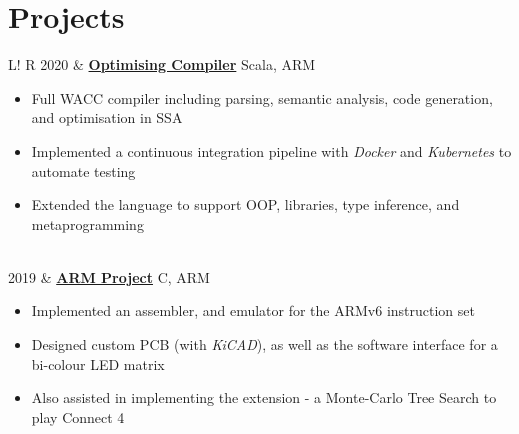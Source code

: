\documentclass[10pt, a4paper]{article}
\newcommand\vsep{\color{lightgray} \vrule width 0.5pt}
\newcommand\sect[1]{\section*{\Large\sc #1}}
\newcommand\itemizespace{\vspace{-0.65\baselineskip}}
\newcommand\tspace{\hfill}
\begin{document}
        \sect{Projects}
            \begin{tabular}{L!{\vsep}R}
                2020 & \href{https://github.com/lin-e/WACC}{\textbf{Optimising Compiler}} \tspace Scala, ARM
                    \begin{itemize}[label=\raisebox{0.25ex}{\tiny$\bullet$}]
                        \setlength{\itemindent}{-0.125in}
                        \item Full WACC compiler including parsing, semantic analysis, code generation, and optimisation in SSA
                        \item Implemented a continuous integration pipeline with \textit{Docker} and \textit{Kubernetes} to automate testing
                        \item Extended the language to support OOP, libraries, type inference, and metaprogramming
                        \itemizespace
                    \end{itemize} \\
                2019 & \href{https://github.com/lin-e/imperial-arm11}{\textbf{ARM Project}} \tspace C, ARM
                    \begin{itemize}[label=\raisebox{0.25ex}{\tiny$\bullet$}]
                        \setlength{\itemindent}{-0.125in}
                        \item Implemented an assembler, and emulator for the ARMv6 instruction set
                        \item Designed custom PCB (with \textit{KiCAD}), as well as the software interface for a bi-colour LED matrix
                        \item Also assisted in implementing the extension - a Monte-Carlo Tree Search to play Connect 4
                        \itemizespace
                    \end{itemize} \\

\end{tabular}
\end{document}
